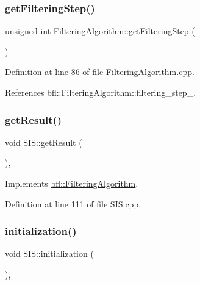 \subsubsection{\texorpdfstring{get\+Filtering\+Step()}{getFilteringStep()}}
{\footnotesize\ttfamily unsigned int Filtering\+Algorithm\+::get\+Filtering\+Step (\begin{DoxyParamCaption}{ }\end{DoxyParamCaption})\hspace{0.3cm}{\ttfamily [inherited]}}



Definition at line 86 of file Filtering\+Algorithm.\+cpp.



References bfl\+::\+Filtering\+Algorithm\+::filtering\+\_\+step\+\_\+.

\mbox{\label{classbfl_1_1SIS_a059da4c932379643ff7005fe4d0fda89}} 
\subsubsection{\texorpdfstring{get\+Result()}{getResult()}}
{\footnotesize\ttfamily void S\+I\+S\+::get\+Result (\begin{DoxyParamCaption}{ }\end{DoxyParamCaption})\hspace{0.3cm}{\ttfamily [override]}, {\ttfamily [virtual]}}



Implements \mbox{\hyperlink{classbfl_1_1FilteringAlgorithm_acdfebf68405a427491e4dd9d020ae09b}{bfl\+::\+Filtering\+Algorithm}}.



Definition at line 111 of file S\+I\+S.\+cpp.

\mbox{\label{classbfl_1_1SIS_aaf9f4a14d51804eddcd93aa8a5ccbba8}} 
\subsubsection{\texorpdfstring{initialization()}{initialization()}}
{\footnotesize\ttfamily void S\+I\+S\+::initialization (\begin{DoxyParamCaption}{ }\end{DoxyParamCaption})\hspace{0.3cm}{\ttfamily [override]}, {\ttfamily [virtual]}}



